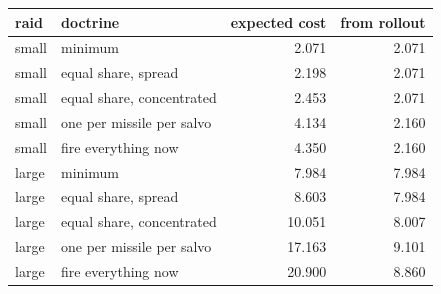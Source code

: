 \begin{tabular}{llrr}
\toprule
raid & doctrine & expected cost & from rollout \\
\midrule
small & minimum & 2.071 & 2.071 \\
small & equal share, spread & 2.198 & 2.071 \\
small & equal share, concentrated & 2.453 & 2.071 \\
small & one per missile per salvo & 4.134 & 2.160 \\
small & fire everything now & 4.350 & 2.160 \\
large & minimum & 7.984 & 7.984 \\
large & equal share, spread & 8.603 & 7.984 \\
large & equal share, concentrated & 10.051 & 8.007 \\
large & one per missile per salvo & 17.163 & 9.101 \\
large & fire everything now & 20.900 & 8.860 \\
\bottomrule
\end{tabular}
